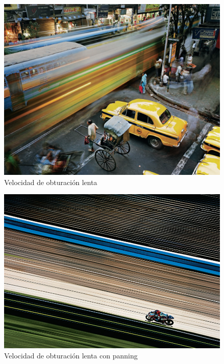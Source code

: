 \documentclass{article}
\begin{document}
\begin{figure}[H]
	\centering
	\includegraphics[width=0.85\linewidth]{Figuras/Shutter_Speed_5}
	\caption{Velocidad de obturación lenta}
	\label{fig:shutterspeed2}
\end{figure}

\begin{figure}[H]
	\centering
	\includegraphics[width=0.80\linewidth]{Figuras/Shutter_Speed_6}
	\caption{Velocidad de obturación lenta con panning}
	\label{fig:shutterspeed3}
\end{figure}
\end{document}
